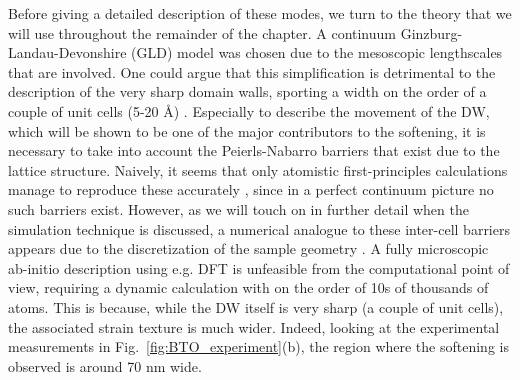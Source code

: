 Before giving a detailed description of these modes, we turn to the theory that we will use throughout the remainder of the chapter. 
A continuum Ginzburg-Landau-Devonshire (GLD) model \cite{Zhirnov1959,L.N.Bulaevskii1963,Marton2010} was chosen due to the mesoscopic lengthscales that are involved.
One could argue that this simplification is detrimental to the description of the very sharp domain walls, sporting a width on the order of a couple of unit cells (5-20 \AA) \cite{Zhirnov1959}.
Especially to describe the movement of the DW, which will be shown to be one of the major contributors to the softening, it is necessary to take into account the Peierls-Nabarro barriers that exist due to the lattice structure.
Naively, it seems that only atomistic first-principles calculations manage to reproduce these accurately \cite{Meyer2002}, since in a perfect continuum picture no such barriers exist.
However, as we will touch on in further detail when the simulation technique is discussed, a numerical analogue to these inter-cell barriers appears due to the discretization of the sample geometry \cite{Marton2018}.  
A fully microscopic ab-initio description using e.g. DFT is unfeasible from the computational point of view, requiring a dynamic calculation with on the order of 10s of thousands of atoms.
This is because, while the DW itself is very sharp (a couple of unit cells), the associated strain texture is much wider.
Indeed, looking at the experimental measurements in Fig.~\ref{fig:BTO_experiment}(b), the region where the softening is observed is around 70 nm wide.

